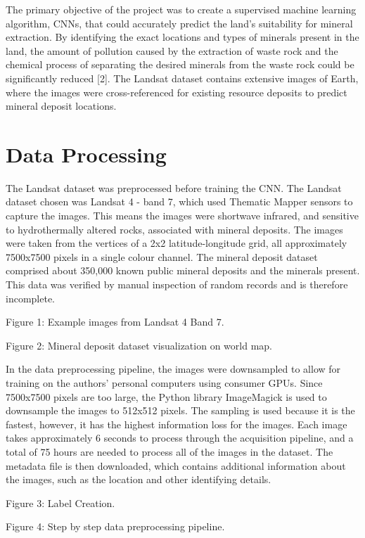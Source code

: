 \documentclass[10pt]{article}
\begin{document}
The primary objective of the project was to create a supervised
machine learning algorithm, CNNs, that could accurately predict the land's
suitability for mineral extraction. By identifying the exact locations and types
of minerals present in the land, the amount of pollution caused by the
extraction of waste rock and the chemical process of separating the desired
minerals from the waste rock could be significantly reduced [2]. The Landsat
dataset contains extensive images of Earth, where the images were cross-referenced
for existing resource deposits to predict mineral deposit locations.

\section{Data Processing}

The Landsat dataset was preprocessed before training the CNN. The Landsat dataset
chosen was Landsat 4 - band 7, which used Thematic Mapper sensors to capture the
images. This means the images were shortwave infrared, and sensitive to
hydrothermally altered rocks, associated with mineral deposits. The images were
taken from the vertices of a 2x2 latitude-longitude grid, all approximately
7500x7500 pixels in a single colour channel. The mineral deposit dataset
comprised about 350,000 known public mineral deposits and the minerals present.
This data was verified by manual inspection of random records and is therefore
incomplete.

Figure 1: Example images from Landsat 4 Band 7.

Figure 2: Mineral deposit dataset visualization on world map. 

In the data preprocessing pipeline, the images were downsampled to allow for
training on the authors’ personal computers using consumer GPUs. Since 7500x7500
pixels are too large, the Python library ImageMagick is used to downsample the
images to 512x512 pixels. The sampling is used because it is the fastest,
however, it has the highest information loss for the images. Each image takes
approximately 6 seconds to process through the acquisition pipeline, and a total
of 75 hours are needed to process all of the images in the dataset. The metadata
file is then downloaded, which contains additional information about the images,
such as the location and other identifying details.

Figure 3: Label Creation. 

Figure 4: Step by step data preprocessing pipeline. 
\end{document}
